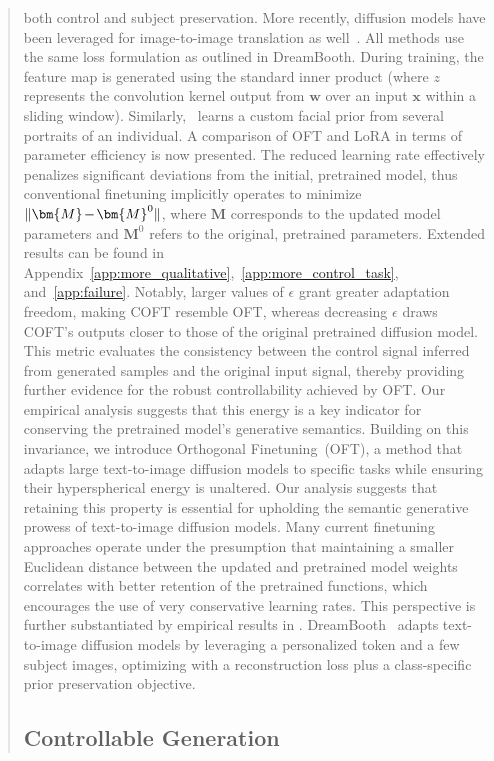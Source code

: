 \begin{itemize}[leftmargin=*,nosep]
\begin{abstract}
both control and subject preservation. More recently, diffusion models have been leveraged for image-to-image translation as well~\cite{saharia2022palette,voynov2022sketch,wang2022pretraining}. All methods use the same loss formulation as outlined in DreamBooth. During training, the feature map is generated using the standard inner product (where $z$ represents the convolution kernel output from $\bm{w}$ over an input $\bm{x}$ within a sliding window). Similarly,~\cite{nitzan2022mystyle} learns a custom facial prior from several portraits of an individual. A comparison of OFT and LoRA in terms of parameter efficiency is now presented. The reduced learning rate effectively penalizes significant deviations from the initial, pretrained model, thus conventional finetuning implicitly operates to minimize $\thickmuskip=2mu \medmuskip=2mu \| \bm{M} - \bm{M}^0\|$, where $\bm{M}$ corresponds to the updated model parameters and $\bm{M}^0$ refers to the original, pretrained parameters. Extended results can be found in Appendix~\ref{app:more_qualitative},~\ref{app:more_control_task}, and~\ref{app:failure}. Notably, larger values of $\epsilon$ grant greater adaptation freedom, making COFT resemble OFT, whereas decreasing $\epsilon$ draws COFT's outputs closer to those of the original pretrained diffusion model. This metric evaluates the consistency between the control signal inferred from generated samples and the original input signal, thereby providing further evidence for the robust controllability achieved by OFT. Our empirical analysis suggests that this energy is a key indicator for conserving the pretrained model’s generative semantics. Building on this invariance, we introduce Orthogonal Finetuning~(OFT), a method that adapts large text-to-image diffusion models to specific tasks while ensuring their hyperspherical energy is unaltered. Our analysis suggests that retaining this property is essential for upholding the semantic generative prowess of text-to-image diffusion models. Many current finetuning approaches operate under the presumption that maintaining a smaller Euclidean distance between the updated and pretrained model weights correlates with better retention of the pretrained functions, which encourages the use of very conservative learning rates. This perspective is further substantiated by empirical results in \cite{liu2021orthogonal}. DreamBooth~\cite{ruiz2023dreambooth} adapts text-to-image diffusion models by leveraging a personalized token and a few subject images, optimizing with a reconstruction loss plus a class-specific prior preservation objective. \subsection{Controllable Generation}


\end{abstract}
\end{itemize}
